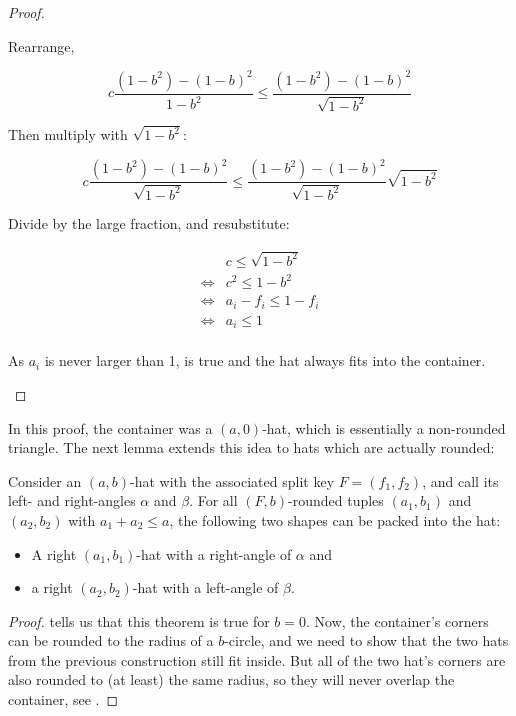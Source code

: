 \documentclass[a4paper,style=print,bibliography=totoc,nexus,lnum,extramargin]{tubsbook}
\begin{document}
\begin{proof}
\begin{itemize}
            Rearrange,

            $$c\frac{(1-b^2)-(1-b)^2}{1-b^2} \le \frac{(1-b^2)-(1-b)^2}{\sqrt{1-b^2}}$$

            Then multiply with $\sqrt{1-b^2}$:

            $$c\frac{(1-b^2)-(1-b)^2}{\sqrt{1-b^2}} \le \frac{(1-b^2)-(1-b)^2}{\sqrt{1-b^2}}\sqrt{1-b^2}$$

            Divide by the large fraction, and resubstitute:

            \begin{align*}
                &c \le \sqrt{1-b^2}\\
                \iff &c^2 \le 1-b^2\\
                \iff &a_i - f_i \le 1-f_i\\
                \iff &a_i \le 1\\
            \end{align*}

            As $a_i$ is never larger than 1,  is true and the hat always fits into the container.
    \end{itemize}
\end{proof}

In this proof, the container was a $(a,0)$-hat, which is essentially a non-rounded triangle. The next lemma extends this idea to hats which are actually rounded:

\begin{lemma}\label{th:roundedhatsinhat}
    Consider an $(a,b)$-hat with the associated split key $F = (f_1, f_2)$, and call its left- and right-angles $\alpha$ and $\beta$.
    For all $(F,b)$-rounded tuples $(a_1, b_1)$ and $(a_2, b_2)$ with $a_1 + a_2 \le a$, the following two shapes can be packed into the hat:
    \begin{itemize}
        \item A right $(a_1,b_1)$-hat with a right-angle of $\alpha$ and
        \item a right $(a_2,b_2)$-hat with a left-angle of $\beta$.
    \end{itemize}
\end{lemma}

\begin{proof}
     tells us that this theorem is true for $b = 0$. Now, the container's corners can be rounded to the radius of a $b$-circle, and we need to show that the two hats from the previous construction still fit inside. But all of the two hat's corners are also rounded to (at least) the same radius, so they will never overlap the container, see .
\end{proof}
\end{document}
